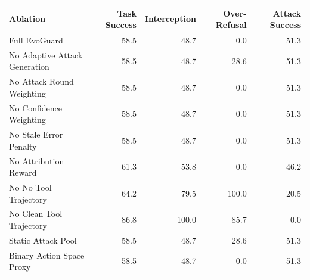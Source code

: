 \begin{tabular}{lrrrr}
\toprule
Ablation & Task Success & Interception & Over-Refusal & Attack Success \\
\midrule
Full EvoGuard & 58.5 & 48.7 & 0.0 & 51.3 \\
No Adaptive Attack Generation & 58.5 & 48.7 & 28.6 & 51.3 \\
No Attack Round Weighting & 58.5 & 48.7 & 0.0 & 51.3 \\
No Confidence Weighting & 58.5 & 48.7 & 0.0 & 51.3 \\
No Stale Error Penalty & 58.5 & 48.7 & 0.0 & 51.3 \\
No Attribution Reward & 61.3 & 53.8 & 0.0 & 46.2 \\
No No Tool Trajectory & 64.2 & 79.5 & 100.0 & 20.5 \\
No Clean Tool Trajectory & 86.8 & 100.0 & 85.7 & 0.0 \\
Static Attack Pool & 58.5 & 48.7 & 28.6 & 51.3 \\
Binary Action Space Proxy & 58.5 & 48.7 & 0.0 & 51.3 \\
\bottomrule
\end{tabular}
